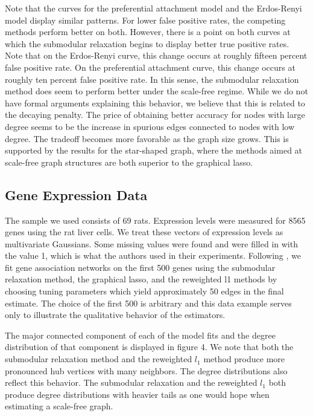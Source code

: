 \documentclass{uwstat572}
\theoremstyle{remark}
\theoremstyle{definition}
\begin{document}
Note that the curves for the preferential attachment model and the Erdos-Renyi model display similar patterns.  For lower false positive rates, the competing methods perform better on both.  However, there is a point on both curves at which the submodular relaxation begins to display better true positive rates.  Note that on the Erdos-Renyi curve, this change occurs at roughly fifteen percent false positive rate.  On the preferential attachment curve, this change occurs at roughly ten percent false positive rate.  In this sense, the submodular relaxation method does seem to perform better under the scale-free regime.  While we do not have formal arguments explaining this behavior, we believe that this is related to the decaying penalty.  The price of obtaining better accuracy for nodes with large degree seems to be the increase in spurious edges connected to nodes with low degree.  The tradeoff becomes more favorable as the graph size grows.  This is supported by the results for the star-shaped graph, where the methods aimed at scale-free graph structures are both superior to the graphical lasso.  





\subsection{Gene Expression Data}

The sample we used consists of 69 rats.  Expression levels were measured for 8565 genes using the rat liver cells.  We treat these vectors of expression levels as multivariate Gaussians.  Some missing values were found and were filled in with the value 1, which is what the authors used in their experiments.  Following \cite{Defazio2012}, we fit gene association networks on the first 500 genes using the submodular relaxation method, the graphical lasso, and the reweighted l1 methods by choosing tuning parameters which yield approximately 50 edges in the final estimate.  The choice of the first 500 is arbitrary and this data example serves only to illustrate the qualitative behavior of the estimators.  

The major connected component of each of the model fits and the degree distribution of that component is displayed in figure 4.  We note that both the submodular relaxation method and the reweighted $l_1$ method produce more pronounced hub vertices with many neighbors.  The degree distributions also reflect this behavior.  The submodular relaxation and the reweighted $l_1$ both produce degree distributions with heavier tails as one would hope when estimating a scale-free graph.
\end{document}
